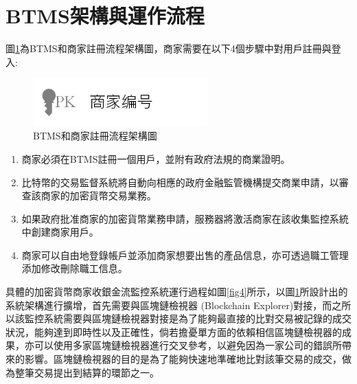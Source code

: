 \section{BTMS架構與運作流程}

	圖\ref{fig3}為BTMS和商家註冊流程架構圖，商家需要在以下4個步驟中對用戶註冊與登入:

	\begin{figure}[!htbp]
		\centering
		\includegraphics[width = 0.6\textwidth]{fig3.jpg}
		\caption{BTMS和商家註冊流程架構圖}\label{fig3}
	\end{figure}

	\begin{enumerate}
		\item 商家必須在BTMS註冊一個用戶，並附有政府法規的商業證明。
		\item 比特幣的交易監督系統將自動向相應的政府金融監管機構提交商業申請，以審查該商家的加密貨幣交易業務。
		\item 如果政府批准商家的加密貨幣業務申請，服務器將激活商家在該收集監控系統中創建商家用戶。
		\item 商家可以自由地登錄帳戶並添加商家想要出售的產品信息，亦可透過職工管理添加修改刪除職工信息。
	\end{enumerate}

	具體的加密貨幣商家收銀金流監控系統運行過程如圖\ref{fig4}所示，以圖\ref{fig3}所設計出的系統架構進行擴增，首先需要與區塊鏈檢視器 (Blockchain Explorer)\supercite{Blockchainexplorer:Ananalyticalprocessandinvestigationenvironmentforbitcoin}對接，而之所以該監控系統需要與區塊鏈檢視器對接是為了能夠最直接的比對交易被記錄的成交狀況，能夠達到即時性以及正確性，倘若擔憂單方面的依賴相信區塊鏈檢視器的成果，亦可以使用多家區塊鏈檢視器進行交叉參考，以避免因為一家公司的錯誤所帶來的影響。區塊鏈檢視器的目的是為了能夠快速地準確地比對該筆交易的成交，做為整筆交易提出到結算的環節之一。


